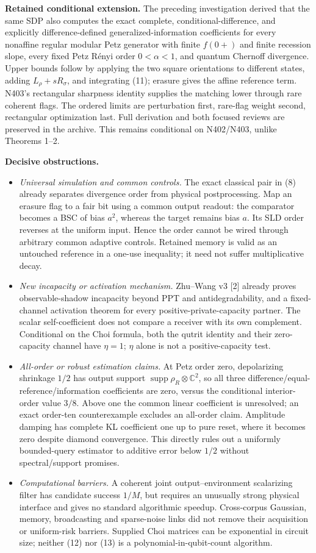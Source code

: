 \documentclass[10pt,a4paper]{article}
\newcommand{\supp}{\operatorname{supp}}
\begin{document}
\textbf{Retained conditional extension.} The preceding investigation derived that the same SDP also computes the exact complete, conditional-difference, and explicitly difference-defined generalized-information coefficients for every nonaffine regular modular Petz generator with finite $f(0+)$ and finite recession slope, every fixed Petz R\'enyi order $0<\alpha<1$, and quantum Chernoff divergence. Upper bounds follow by applying the two square orientations to different states, adding $L_\rho+sR_\sigma$, and integrating (11); erasure gives the affine reference term. N403's rectangular sharpness identity supplies the matching lower through rare coherent flags. The ordered limits are perturbation first, rare-flag weight second, rectangular optimization last. Full derivation and both focused reviews are preserved in the archive. This remains conditional on N402/N403, unlike Theorems 1--2.

\textbf{Decisive obstructions.}
\begin{itemize}
\item \emph{Universal simulation and common controls.} The exact classical pair in (8) already separates divergence order from physical postprocessing. Map an erasure flag to a fair bit using a common output readout: the comparator becomes a BSC of bias $a^2$, whereas the target remains bias $a$. Its SLD order reverses at the uniform input. Hence the order cannot be wired through arbitrary common adaptive controls. Retained memory is valid as an untouched reference in a one-use inequality; it need not suffer multiplicative decay.
\item \emph{New incapacity or activation mechanism.} Zhu--Wang v3 [2] already proves observable-shadow incapacity beyond PPT and antidegradability, and a fixed-channel activation theorem for every positive-private-capacity partner. The scalar self-coefficient does not compare a receiver with its own complement. Conditional on the Choi formula, both the qutrit identity and their zero-capacity channel have $\eta=1$; $\eta$ alone is not a positive-capacity test.
\item \emph{All-order or robust estimation claims.} At Petz order zero, depolarizing shrinkage $1/2$ has output support $\supp\rho_R\otimes\mathbb C^2$, so all three difference/equal-reference/information coefficients are zero, versus the conditional interior-order value $3/8$. Above one the common linear coefficient is unresolved; an exact order-ten counterexample excludes an all-order claim. Amplitude damping has complete KL coefficient one up to pure reset, where it becomes zero despite diamond convergence. This directly rules out a uniformly bounded-query estimator to additive error below $1/2$ without spectral/support promises.
\item \emph{Computational barriers.} A coherent joint output--environment scalarizing filter has candidate success $1/M$, but requires an unusually strong physical interface and gives no standard algorithmic speedup. Cross-corpus Gaussian, memory, broadcasting and sparse-noise links did not remove their acquisition or uniform-risk barriers. Supplied Choi matrices can be exponential in circuit size; neither (12) nor (13) is a polynomial-in-qubit-count algorithm.
\end{itemize}
\end{document}
